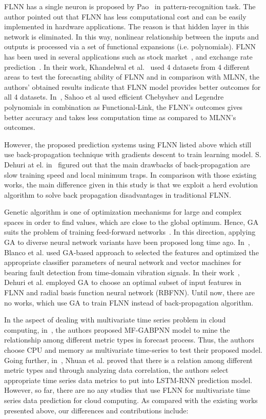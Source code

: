 \documentclass[conference]{IEEEtran}
\begin{document}
FLNN has a single neuron is proposed by Pao~\cite{ref_pao} in pattern-recognition task. The author pointed out that FLNN has less computational cost and can be easily implemented in hardware applications. The reason is that hidden layer in this network is eliminated. In this way, nonlinear relationship between the inputs and outputs is processed via a set of functional expansions (i.e. polynomials). FLNN has been used in several applications such as stock market~\cite{ref_majhi}, and exchange rate prediction~\cite{ref_rout}. In their work, Khandelwal et al.~\cite{ref_khan} used 4 datasets from 4 different areas to test the forecasting ability of FLNN and in comparison with MLNN, the authors' obtained results indicate that FLNN model provides better outcomes for all 4 datasets. In~\cite{ref_sahoo}, Sahoo et al used efficient Chebyshev and Legendre polynomials in combination as Functional-Link, the FLNN's outcomes gives better accuracy and takes less computation time as compared to MLNN's outcomes.

However, the proposed prediction systems using FLNN listed above which still use back-propagation technique with gradients descent to train learning model. S. Dehuri at el. in~\cite{ref_dehuri} figured out that the main drawbacks of back-propagation are slow training speed and local minimum traps. In comparison with those existing works, the main difference given in this study is that we exploit a herd evolution algorithm to solve back propagation disadvantages in traditional FLNN. 

Genetic algorithm is one of optimization mechanisms for large and complex spaces in order to find values, which are close to the global optimum. Hence, GA suits the problem of training feed-forward networks~\cite{ref_motana}. In this direction, applying GA to diverse neural network variants have been proposed long time ago. In~\cite{ref_blanco}, Blanco et al. used GA-based approach to selected the features and optimized the appropriate classifier parameters of neural network and vector machines for bearing fault detection from time-domain vibration signals. In their work~\cite{ref_dehuri_2}, Dehuri et al. employed GA to choose an optimal subset of input features in FLNN and radial basis function neural network (RBFNN). Until now, there are no works, which use GA to train FLNN instead of back-propagation algorithm. 

In the aspect of dealing with multivariate time series problem in cloud computing, in~\cite{ref_dang}, the authors proposed MF-GABPNN model to mine the relationship among different metric types in forecast process. Thus, the authors choose CPU and memory as multivariate time-series to test their proposed model. Going further, in~\cite{ref_nhuan}, Nhuan et al. proved that there is a relation among different metric types and through analyzing data correlation, the authors select appropriate time series data metrics to put into LSTM-RNN prediction model. However, so far, there are no any studies that use FLNN for multivariate time series data prediction for cloud computing. As compared with the existing works presented above, our differences and contributions include:
\end{document}
